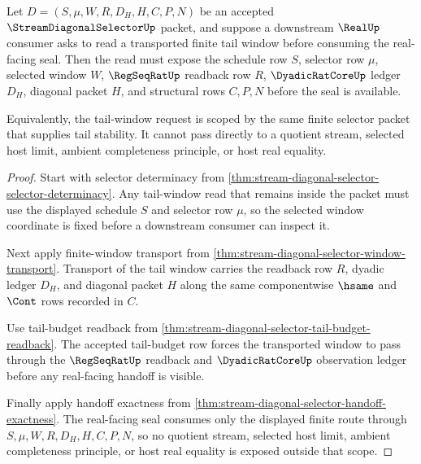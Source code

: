 \begin{theorem}
\label{thm:stream-diagonal-selector-tail-window-scope}
Let $D=(S,\mu,W,R,D_H,H,C,P,N)$ be an accepted $\StreamDiagonalSelectorUp$ packet, and suppose a downstream $\RealUp$ consumer asks to read a transported finite tail window before consuming the real-facing seal. Then the read must expose the schedule row $S$, selector row $\mu$, selected window $W$, $\RegSeqRatUp$ readback row $R$, $\DyadicRatCoreUp$ ledger $D_H$, diagonal packet $H$, and structural rows $C,P,N$ before the seal is available.

Equivalently, the tail-window request is scoped by the same finite selector packet that supplies tail stability. It cannot pass directly to a quotient stream, selected host limit, ambient completeness principle, or host real equality.
\end{theorem}
\begin{proof}
Start with selector determinacy from \autoref{thm:stream-diagonal-selector-selector-determinacy}. Any tail-window read that remains inside the packet must use the displayed schedule $S$ and selector row $\mu$, so the selected window coordinate is fixed before a downstream consumer can inspect it.

Next apply finite-window transport from \autoref{thm:stream-diagonal-selector-window-transport}. Transport of the tail window carries the readback row $R$, dyadic ledger $D_H$, and diagonal packet $H$ along the same componentwise $\hsame$ and $\Cont$ rows recorded in $C$.

Use tail-budget readback from \autoref{thm:stream-diagonal-selector-tail-budget-readback}. The accepted tail-budget row forces the transported window to pass through the $\RegSeqRatUp$ readback and $\DyadicRatCoreUp$ observation ledger before any real-facing handoff is visible.

Finally apply handoff exactness from \autoref{thm:stream-diagonal-selector-handoff-exactness}. The real-facing seal consumes only the displayed finite route through $S,\mu,W,R,D_H,H,C,P,N$, so no quotient stream, selected host limit, ambient completeness principle, or host real equality is exposed outside that scope.
\end{proof}

